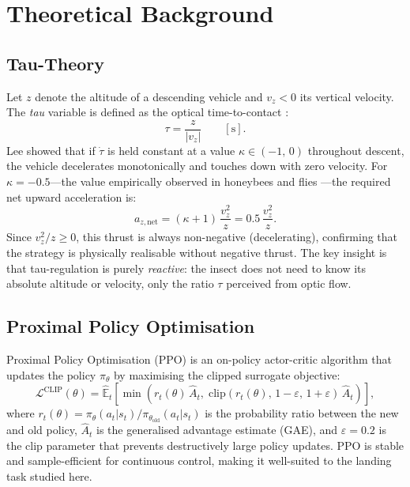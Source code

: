 \chapter{Theoretical Background}
\label{ch:theory}

\section{Tau-Theory}
\label{sec:tau}

Let $z$ denote the altitude of a descending vehicle and $v_z < 0$ its vertical velocity.
The \emph{tau} variable is defined as the optical time-to-contact \cite{lee1976}:
%
\begin{equation}
  \tau = \frac{z}{|v_z|}  \qquad [\text{s}].
  \label{eq:tau}
\end{equation}
%
Lee \cite{lee1976} showed that if $\dot{\tau}$ is held constant at a value
$\kappa \in (-1,\, 0)$ throughout descent, the vehicle decelerates monotonically and
touches down with zero velocity.
For $\kappa = -0.5$---the value empirically observed in honeybees \cite{srinivasan1996}
and flies \cite{wagner1982}---the required net upward acceleration is:
%
\begin{equation}
  a_{z,\text{net}} = (\kappa + 1)\,\frac{v_z^2}{z} = 0.5\,\frac{v_z^2}{z}.
  \label{eq:tau_thrust}
\end{equation}
%
Since $v_z^2/z \geq 0$, this thrust is always non-negative (decelerating), confirming
that the strategy is physically realisable without negative thrust.
The key insight is that tau-regulation is purely \emph{reactive}: the insect does not need
to know its absolute altitude or velocity, only the ratio $\tau$ perceived from optic flow.

\section{Proximal Policy Optimisation}
\label{sec:ppo}

Proximal Policy Optimisation (PPO) \cite{schulman2017ppo} is an on-policy actor-critic
algorithm that updates the policy $\pi_\theta$ by maximising the clipped surrogate
objective:
%
\begin{equation}
  \mathcal{L}^{\text{CLIP}}(\theta) =
  \hat{\mathbb{E}}_t\!\left[
    \min\!\left(r_t(\theta)\,\hat{A}_t,\;
    \mathrm{clip}(r_t(\theta),\, 1{-}\varepsilon,\, 1{+}\varepsilon)\,\hat{A}_t
    \right)
  \right],
  \label{eq:ppo}
\end{equation}
%
where $r_t(\theta) = \pi_\theta(a_t | s_t) / \pi_{\theta_\text{old}}(a_t | s_t)$
is the probability ratio between the new and old policy, $\hat{A}_t$ is the generalised
advantage estimate (GAE), and $\varepsilon = 0.2$ is the clip parameter that prevents
destructively large policy updates.
PPO is stable and sample-efficient for continuous control, making it well-suited to the
landing task studied here.


